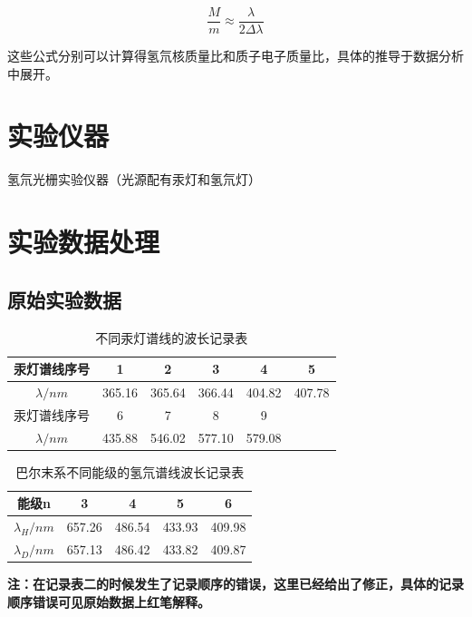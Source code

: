 \documentclass[a4paper,UTF8]{ctexart}
\begin{document}
\begin{equation}
    \frac{M}{m} \approx \frac{\lambda}{2 \Delta \lambda}
\end{equation}

这些公式分别可以计算得氢氘核质量比和质子电子质量比，具体的推导于数据分析中展开。

\section{实验仪器}

氢氘光栅实验仪器（光源配有汞灯和氢氘灯）

\section{实验数据处理}

\subsection{原始实验数据}

\begin{table}[H]
    \centering
    \begin{tabular}{|c|c|c|c|c|c|}
    \hline
        汞灯谱线序号 & 1 & 2 & 3 & 4 & 5 \\ \hline
        $\lambda /nm$ & 365.16 & 365.64 & 366.44 & 404.82 & 407.78 \\ \hline
        汞灯谱线序号 & 6 & 7 & 8 & 9 &  \\ \hline
        $\lambda /nm$ & 435.88 & 546.02 & 577.10 & 579.08 &  \\ \hline
    \end{tabular}
    \caption{不同汞灯谱线的波长记录表}
\end{table}

\begin{table}[H]
    \centering
    \begin{tabular}{|c|c|c|c|c|}
    \hline
        能级n & 3 & 4 & 5 & 6 \\ \hline
        $\lambda_{H}/nm$ & 657.26 & 486.54 & 433.93 & 409.98 \\ \hline
        $\lambda_{D}/nm$ & 657.13 & 486.42 & 433.82 & 409.87 \\ \hline
    \end{tabular}
    \caption{巴尔末系不同能级的氢氘谱线波长记录表}
\end{table}

{\bfseries 注：在记录表二的时候发生了记录顺序的错误，这里已经给出了修正，具体的记录顺序错误可见原始数据上红笔解释。}
\end{document}
